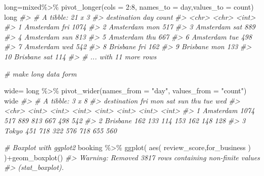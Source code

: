 \documentclass[
]{article}
\newenvironment{Shaded}{\begin{snugshade}}{\end{snugshade}}
\newcommand{\AttributeTok}[1]{\textcolor[rgb]{0.77,0.63,0.00}{#1}}
\newcommand{\CommentTok}[1]{\textcolor[rgb]{0.56,0.35,0.01}{\textit{#1}}}
\newcommand{\DecValTok}[1]{\textcolor[rgb]{0.00,0.00,0.81}{#1}}
\newcommand{\FunctionTok}[1]{\textcolor[rgb]{0.00,0.00,0.00}{#1}}
\newcommand{\NormalTok}[1]{#1}
\newcommand{\OtherTok}[1]{\textcolor[rgb]{0.56,0.35,0.01}{#1}}
\newcommand{\SpecialCharTok}[1]{\textcolor[rgb]{0.00,0.00,0.00}{#1}}
\newcommand{\StringTok}[1]{\textcolor[rgb]{0.31,0.60,0.02}{#1}}
\begin{document}
\begin{Shaded}
\begin{Highlighting}[]
\NormalTok{long}\OtherTok{=}\NormalTok{mixed}\SpecialCharTok{\%\textgreater{}\%}
  \FunctionTok{pivot\_longer}\NormalTok{(}\AttributeTok{cols =} \DecValTok{2}\SpecialCharTok{:}\DecValTok{8}\NormalTok{, }\AttributeTok{names\_to =} \StringTok{\textquotesingle{}day\textquotesingle{}}\NormalTok{,}\AttributeTok{values\_to =} \StringTok{\textquotesingle{}count\textquotesingle{}}\NormalTok{)}
\NormalTok{long}
\CommentTok{\#\textgreater{} \# A tibble: 21 x 3}
\CommentTok{\#\textgreater{}    destination day   count}
\CommentTok{\#\textgreater{}    \textless{}chr\textgreater{}       \textless{}chr\textgreater{} \textless{}int\textgreater{}}
\CommentTok{\#\textgreater{}  1 Amsterdam   fri    1074}
\CommentTok{\#\textgreater{}  2 Amsterdam   mon     517}
\CommentTok{\#\textgreater{}  3 Amsterdam   sat     889}
\CommentTok{\#\textgreater{}  4 Amsterdam   sun     813}
\CommentTok{\#\textgreater{}  5 Amsterdam   thu     667}
\CommentTok{\#\textgreater{}  6 Amsterdam   tue     498}
\CommentTok{\#\textgreater{}  7 Amsterdam   wed     542}
\CommentTok{\#\textgreater{}  8 Brisbane    fri     162}
\CommentTok{\#\textgreater{}  9 Brisbane    mon     133}
\CommentTok{\#\textgreater{} 10 Brisbane    sat     114}
\CommentTok{\#\textgreater{} \# ... with 11 more rows}

\CommentTok{\# make long data form}

\NormalTok{wide}\OtherTok{=}\NormalTok{ long }\SpecialCharTok{\%\textgreater{}\%} 
  \FunctionTok{pivot\_wider}\NormalTok{(}\AttributeTok{names\_from =} \StringTok{"day"}\NormalTok{, }\AttributeTok{values\_from =} \StringTok{"count"}\NormalTok{)}
\NormalTok{wide}
\CommentTok{\#\textgreater{} \# A tibble: 3 x 8}
\CommentTok{\#\textgreater{}   destination   fri   mon   sat   sun   thu   tue   wed}
\CommentTok{\#\textgreater{}   \textless{}chr\textgreater{}       \textless{}int\textgreater{} \textless{}int\textgreater{} \textless{}int\textgreater{} \textless{}int\textgreater{} \textless{}int\textgreater{} \textless{}int\textgreater{} \textless{}int\textgreater{}}
\CommentTok{\#\textgreater{} 1 Amsterdam    1074   517   889   813   667   498   542}
\CommentTok{\#\textgreater{} 2 Brisbane      162   133   114   153   162   148   128}
\CommentTok{\#\textgreater{} 3 Tokyo         451   718   322   576   718   655   560}


\CommentTok{\# Boxplot with ggplot2}
\NormalTok{booking }\SpecialCharTok{\%\textgreater{}\%} 
  \FunctionTok{ggplot}\NormalTok{(}
    \FunctionTok{aes}\NormalTok{(}
\NormalTok{      review\_score,for\_business}
\NormalTok{    )}
\NormalTok{  )}\SpecialCharTok{+}\FunctionTok{geom\_boxplot}\NormalTok{()}
\CommentTok{\#\textgreater{} Warning: Removed 3817 rows containing non{-}finite values}
\CommentTok{\#\textgreater{} (stat\_boxplot).}
\end{Highlighting}
\end{Shaded}
\end{document}
